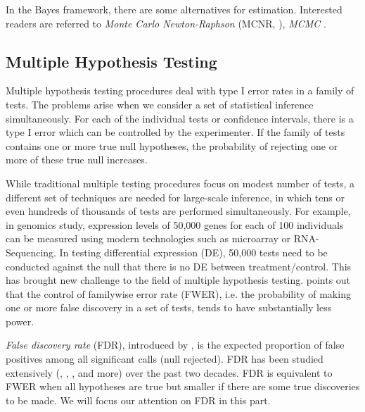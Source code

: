 	
	In the Bayes framework, there are some alternatives for estimation. Interested readers are referred to \textit{Monte Carlo Newton-Raphson} (MCNR, \cite{mcculloch1997maximum}), \textit{MCMC} \citep{hadfield2010mcmc}.
	
	
	\subsection{Multiple Hypothesis Testing}
	Multiple hypothesis testing procedures deal with type I error rates in a family of tests. The problems arise when we consider a set of statistical inference simultaneously.  For each of the individual tests or confidence intervals, there is a type I error which can be controlled by the experimenter.  If the family of tests contains one or more true null hypotheses, the probability of rejecting one or more of these true null increases. 
	
	While traditional multiple testing procedures focus on modest number of tests, a different set of techniques are needed for large-scale inference, in which tens or even hundreds of thousands of tests are performed simultaneously. For example, in genomics study, expression levels of 50,000 genes for each of 100 individuals can be measured using modern technologies such as microarray or RNA-Sequencing. In testing differential expression (DE), 50,000 tests need to be conducted against the null that there is no DE between treatment/control. This has brought new challenge to the field of multiple hypothesis testing. \cite{benjamini1995controlling} points out that the control of familywise error rate (FWER), i.e. the probability of making one or more false discovery in a set of tests, tends to have substantially less power. 
	
	\textit{False discovery rate} (FDR), introduced by \cite{benjamini1995controlling}, is the expected proportion of false positives among all significant calls (null rejected). FDR has been studied extensively (\cite{benjamini2001control}, \cite{storey2003statistical}, \cite{efron2004large}, \cite{efron2010large} and more) over the past two decades.  FDR is equivalent to FWER \citep{benjamini1995controlling} when all hypotheses are true but smaller if there are some true discoveries to be made. We will focus our attention on FDR in this part. 
	
